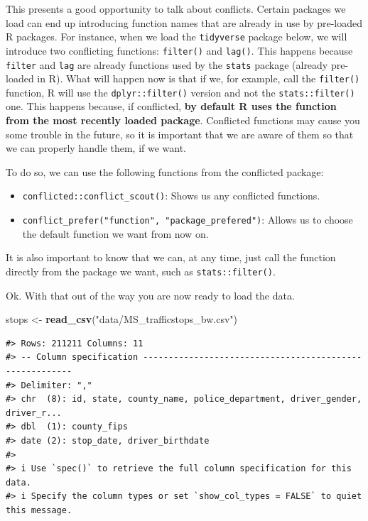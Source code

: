 \documentclass[
]{book}
\newenvironment{Shaded}{\begin{snugshade}}{\end{snugshade}}
\newcommand{\FunctionTok}[1]{\textcolor[rgb]{0.13,0.29,0.53}{\textbf{#1}}}
\newcommand{\NormalTok}[1]{#1}
\newcommand{\OtherTok}[1]{\textcolor[rgb]{0.56,0.35,0.01}{#1}}
\newcommand{\StringTok}[1]{\textcolor[rgb]{0.31,0.60,0.02}{#1}}
\providecommand{\tightlist}{%
  \setlength{\itemsep}{0pt}\setlength{\parskip}{0pt}}
\begin{document}
This presents a good opportunity to talk about conflicts. Certain packages we load can end up introducing function names that are already in use by pre-loaded R packages. For instance, when we load the \texttt{tidyverse} package below, we will introduce two conflicting functions: \texttt{filter()} and \texttt{lag()}. This happens because \texttt{filter} and \texttt{lag} are already functions used by the \texttt{stats} package (already pre-loaded in R). What will happen now is that if we, for example, call the \texttt{filter()} function, R will use the \texttt{dplyr::filter()} version and not the \texttt{stats::filter()} one. This happens because, if conflicted, \textbf{by default R uses the function from the most recently loaded package}. Conflicted functions may cause you some trouble in the future, so it is important that we are aware of them so that we can properly handle them, if we want.

To do so, we can use the following functions from the conflicted package:

\begin{itemize}
\tightlist
\item
  \texttt{conflicted::conflict\_scout()}: Shows us any conflicted functions.
\item
  \texttt{conflict\_prefer("function",\ "package\_prefered")}: Allows us to choose the default function we want from now on.
\end{itemize}

It is also important to know that we can, at any time, just call the function directly from the package we want, such as \texttt{stats::filter()}.

Ok. With that out of the way you are now ready to load the data.

\begin{Shaded}
\begin{Highlighting}[]
\NormalTok{stops }\OtherTok{\textless{}{-}} \FunctionTok{read\_csv}\NormalTok{(}\StringTok{"data/MS\_trafficstops\_bw.csv"}\NormalTok{)}
\end{Highlighting}
\end{Shaded}

\begin{verbatim}
#> Rows: 211211 Columns: 11
#> -- Column specification --------------------------------------------------------
#> Delimiter: ","
#> chr  (8): id, state, county_name, police_department, driver_gender, driver_r...
#> dbl  (1): county_fips
#> date (2): stop_date, driver_birthdate
#> 
#> i Use `spec()` to retrieve the full column specification for this data.
#> i Specify the column types or set `show_col_types = FALSE` to quiet this message.
\end{verbatim}
\end{document}
